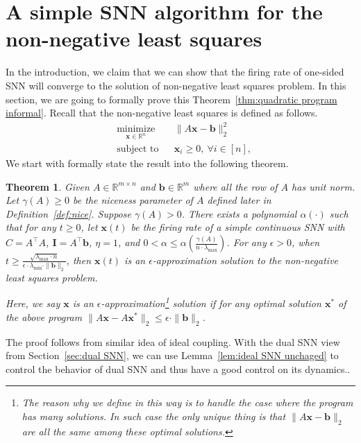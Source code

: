\documentclass[11pt]{article}
\newtheorem{theorem}{Theorem}
\theoremstyle{remark}
\theoremstyle{definition}
\newcommand{\bx}{\mathbf{x}}
\newcommand{\bb}{\mathbf{b}}
\newcommand{\bI}{\mathbf{I}}
\newcommand{\ATA}{A^\top A}
\newcommand{\ATb}{A^\top\bb}
\newcommand{\R}{{\mathbb R}} %
\begin{document}
\section{A simple SNN algorithm for the non-negative least squares}\label{sec:quadratic program}
In the introduction, we claim that we can show that the firing rate of one-sided SNN will converge to the solution of non-negative least squares problem. In this section, we are going to formally prove this Theorem~\ref{thm:quadratic program informal}. Recall that the non-negative least squares is defined as follows.
\begin{equation}\label{op:quadratic program proof}
\begin{aligned}
& \underset{\bx\in\R^n}{\text{minimize}}
& & \|A\bx-\bb\|_2^2 \\
& \text{subject to}
& & \bx_i\geq0,\ \forall i\in[n],
\end{aligned}
\end{equation}
We start with formally state the result into the following theorem.

\begin{theorem}\label{thm:quadratic program} 
	Given $A\in\R^{m\times n}$ and $\bb\in\R^m$ where all the row of $A$ has unit norm. Let $\gamma(A)\geq0$ be the niceness parameter of $A$ defined later in Definition~\ref{def:nice}. Suppose $\gamma(A)>0$. There exists a polynomial $\alpha(\cdot)$ such that for any $t\geq0$, let $\bx(t)$ be the firing rate of a simple continuous SNN with $C=\ATA$, $\bI=\ATb$, $\eta=1$, and $0<\alpha\leq \alpha(\frac{\gamma(A)}{n\cdot\lambda_{\max}})$. For any $\epsilon>0$, when $t\geq\frac{\sqrt{\lambda_{\max}\cdot n}}{\epsilon\cdot\lambda_{\min}\cdot\|\bb\|_2}$, then $\bx(t)$ is an $\epsilon$-approximation solution to the non-negative least squares problem.
	
	Here, we say $\bx$ is an $\epsilon$-approximation\footnote{The reason why we define in this way is to handle the case where the program has many solutions. In such case the only \textit{unique} thing is that $\|A\bx-\bb\|_2$ are all the same among these optimal solutions.} solution if for any optimal solution $\bx^*$ of the above program $\|A\bx-A\bx^*\|_2\leq\epsilon\cdot\|\bb\|_2$.
\end{theorem}

The proof follows from similar idea of ideal coupling. With the dual SNN view from Section~\ref{sec:dual SNN}, we can use Lemma~\ref{lem:ideal SNN unchaged} to control the behavior of dual SNN and thus have a good control on its dynamics..
\end{document}
